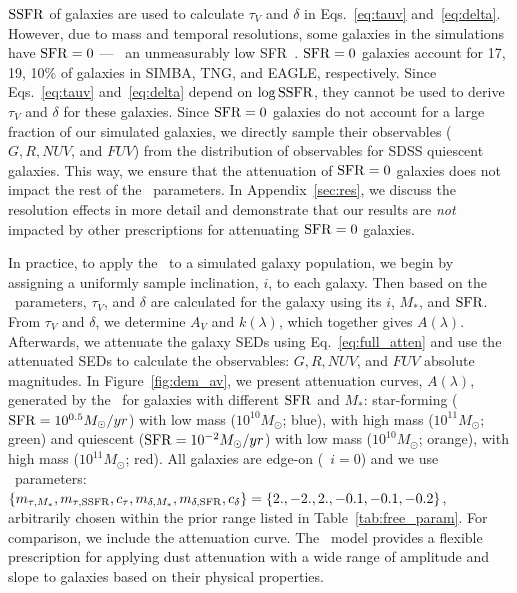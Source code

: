 
${\rm SSFR}$ of galaxies are used to calculate $\tau_V$ and $\delta$ in
Eqs.~\ref{eq:tauv} and~\ref{eq:delta}. However, due to mass and temporal resolutions,
some galaxies in the simulations have ${\rm SFR}=0$ --- \ie~an unmeasurably low
SFR~\citep{hahn2019c}. ${\rm SFR}=0$ galaxies account for 17, 19, 10\% of galaxies
in SIMBA, TNG, and EAGLE, respectively. Since Eqs.~\ref{eq:tauv}
and~\ref{eq:delta} depend on $\log{\rm SSFR}$, they cannot be used to derive $\tau_V$ 
and $\delta$ for these galaxies. Since ${\rm SFR}=0$ galaxies do
not account for a large fraction of our simulated galaxies, we directly sample 
their observables ($G, R, NUV$, and $FUV$) from the distribution of observables
for SDSS quiescent galaxies. This way, we ensure that the attenuation of ${\rm SFR}=0$ 
galaxies does not impact the rest of the \eda~parameters. In Appendix~\ref{sec:res}, 
we discuss the resolution effects in more detail and demonstrate that our results
are \emph{not} impacted by other prescriptions for attenuating ${\rm SFR}=0$ galaxies.

In practice, to apply the \eda~to a simulated galaxy population, we begin by
assigning a uniformly sample inclination, $i$, to each galaxy. Then based on
the \eda~parameters, $\tau_V$, and $\delta$ are calculated for the galaxy using
its $i$, $M_*$, and ${\rm SFR}$. From $\tau_V$ and $\delta$, we determine $A_V$ and
$k(\lambda)$, which together gives $A(\lambda)$.  Afterwards, we attenuate the
galaxy SEDs using Eq.~\ref{eq:full_atten} and use the attenuated SEDs to
calculate the observables: $G, R, NUV$, and $FUV$
absolute magnitudes. In Figure~\ref{fig:dem_av}, we present attenuation curves,
$A(\lambda)$, generated by the \eda~for galaxies with different ${\rm SFR}$ and $M_*$: 
star-forming (${\rm SFR}=10^{0.5}M_\odot/yr$) with low mass ($10^{10}M_\odot$;
blue), with high mass ($10^{11}M_\odot$; green) and quiescent
(${\rm SFR}=10^{-2}M_\odot/yr$) with low mass ($10^{10}M_\odot$; orange), with high
mass ($10^{11}M_\odot$; red). All galaxies are edge-on (\ie~$i=0$) and we use
\eda~parameters: $\{m_{\tau,M_*}, m_{\tau,{\rm SSFR}}, c_\tau, m_{\delta,M_*}, m_{\delta,{\rm SFR}}, c_\delta\} =
\{2., -2., 2., -0.1, -0.1, -0.2\}$, arbitrarily chosen within the prior range
listed in Table~\ref{tab:free_param}. For comparison, we include the
\cite{calzetti2001} attenuation curve. The \eda~model provides a flexible
prescription for applying dust attenuation with a wide range of amplitude and
slope to galaxies based on their physical properties. 


